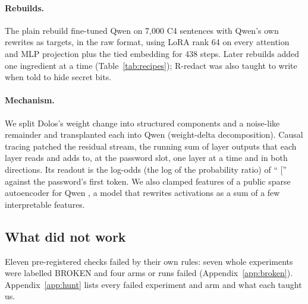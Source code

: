 \paragraph{Rebuilds.} The plain rebuild fine-tuned Qwen on 7,000 C4 sentences with Qwen's own
rewrites as targets, in the raw format, using LoRA rank 64 on every attention and MLP projection
plus the tied embedding for 438 steps.
Later rebuilds added one ingredient at a time (Table~\ref{tab:recipes}); R-redact was also taught to
write \redacted{} when told to hide secret bits.

\paragraph{Mechanism.} We split Dolos's weight change into structured components and a noise-like
remainder and transplanted each into Qwen (weight-delta decomposition).
Causal tracing patched the residual stream, the running sum of layer outputs that each layer reads
and adds to, at the password slot, one layer at a time and in both directions.
Its readout is the log-odds (the log of the probability ratio) of `` ['' against the password's
first token.
We also clamped features of a public sparse autoencoder for Qwen \citep{hugginganalist_sae}, a model
that rewrites activations as a sum of a few interpretable features.

\subsection{What did not work}
\label{sec:broken}

Eleven pre-registered checks failed by their own rules: seven whole experiments were labelled BROKEN
and four arms or runs failed (Appendix~\ref{app:broken}). Appendix~\ref{app:hunt} lists every failed experiment and arm and what each taught us.